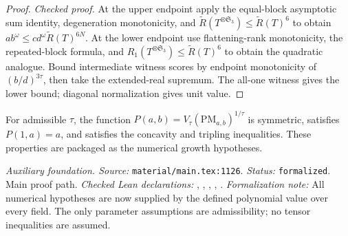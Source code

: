 \begin{proof}
\leanok
{}
\textit{Checked proof.} At the upper endpoint apply the equal-block asymptotic sum identity, degeneration monotonicity, and $\widetilde R(T^{\otimes\mathfrak S_3})\le\widetilde R(T)^6$ to obtain $ab^\omega\le cd^\omega\widetilde R(T)^{6N}$. At the lower endpoint use flattening-rank monotonicity, the repeated-block formula, and $R_1(T^{\otimes\mathfrak S_3})\le\widetilde R(T)^6$ to obtain the quadratic analogue. Bound intermediate witness scores by endpoint monotonicity of $(b/d)^{3\tau}$, then take the extended-real supremum. The all-one witness gives the lower bound; diagonal normalization gives unit value.
\end{proof}

\renewcommand{\thetheorem}{A12}
\begin{lemma}
\label{aux:polynomial-value-hypotheses}
\leanok
For admissible $\tau$, the function $P(a,b)=V_\tau(\mathrm{PM}_{a,b})^{1/\tau}$ is symmetric, satisfies $P(1,a)=a$, and satisfies the concavity and tripling inequalities. These properties are packaged as the numerical growth hypotheses.
\end{lemma}

\noindent\textit{Auxiliary foundation. Source:} \texttt{material/main.tex:1126}.
\textit{Status:} \texttt{formalized}. Main proof path.
\textit{Checked Lean declarations:} , , , , .
\textit{Formalization note:} All numerical hypotheses are now supplied by the defined polynomial value over every field. The only parameter assumptions are admissibility; no tensor inequalities are assumed.

